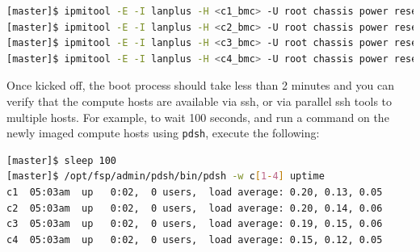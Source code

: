 \documentclass[letterpaper]{article}
\begin{document}
\begin{lstlisting}[language=bash,keywords={},upquote=true]
[master]$ ipmitool -E -I lanplus -H <c1_bmc> -U root chassis power reset   # power cycle c1
[master]$ ipmitool -E -I lanplus -H <c2_bmc> -U root chassis power reset   # power cycle c2
[master]$ ipmitool -E -I lanplus -H <c3_bmc> -U root chassis power reset   # power cycle c3
[master]$ ipmitool -E -I lanplus -H <c4_bmc> -U root chassis power reset   # power cycle c4
\end{lstlisting} 


Once kicked off, the boot process should take less than 2 minutes and you can
verify that the compute hosts are available via ssh, or via parallel ssh tools to multiple
hosts. For example, to wait 100 seconds, and run a command on the newly imaged
compute hosts using \texttt{pdsh}, execute the following:

\begin{lstlisting}[language=bash]
[master]$ sleep 100
[master]$ /opt/fsp/admin/pdsh/bin/pdsh -w c[1-4] uptime
c1  05:03am  up   0:02,  0 users,  load average: 0.20, 0.13, 0.05
c2  05:03am  up   0:02,  0 users,  load average: 0.20, 0.14, 0.06
c3  05:03am  up   0:02,  0 users,  load average: 0.19, 0.15, 0.06
c4  05:03am  up   0:02,  0 users,  load average: 0.15, 0.12, 0.05
\end{lstlisting}

\end{document}
